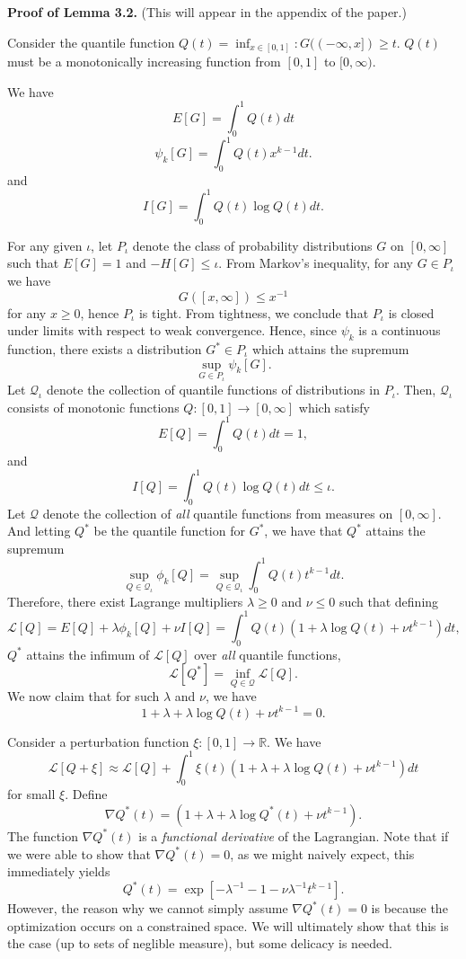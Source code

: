\documentclass[12pt]{article}
\begin{document}
\textbf{Proof of Lemma 3.2.} (This will appear in the appendix of the paper.)

Consider the quantile function $Q(t) = \inf_{x \in [0,1]}: G((-\infty, x]) \geq t.$
$Q(t)$ must be a monotonically increasing function from $[0,1]$ to $[0,\infty).$

We have
\[
E[G] = \int_0^1 Q(t) dt
\]
\[
\psi_k[G] = \int_0^1 Q(t) x^{k-1} dt.
\]
and
\[
I[G] = \int_0^1 Q(t) \log Q(t) dt.
\]

For any given $\iota$, let $P_\iota$ denote the class of probability
distributions $G$ on $[0, \infty]$ such that $E[G]=1$ and
$-H[G] \leq \iota.$  From Markov's inequality, for any $G \in P_\iota$
we have
\[
G([x, \infty]) \leq x^{-1}
\]
for any $x \geq 0$, hence $P_\iota$ is tight.  From tightness, we
conclude that $P_\iota$ is closed under limits with respect to weak
convergence.  Hence, since $\psi_k$ is a continuous function, there
exists a distribution $G^* \in P_\iota$ which attains the supremum
\[\sup_{G \in P_\iota} \psi_k[G].\]
Let $\mathcal{Q}_\iota$ denote the collection of quantile functions of
distributions in $P_\iota.$ Then, $\mathcal{Q}_\iota$ consists of monotonic functions
$Q: [0,1] \to [0, \infty]$ which
satisfy
\[
E[Q] = \int_0^1 Q(t) dt = 1,
\]
and
\[
I[Q] = \int_0^1 Q(t) \log Q(t) dt \leq \iota.
\]
Let $\mathcal{Q}$ denote the collection of \emph{all} quantile functions from measures on $[0,\infty]$.
And letting $Q^*$ be the quantile function for $G^*$, we have that
$Q^*$ attains the supremum
\[
\sup_{Q \in \mathcal{Q}_\iota} \phi_k[Q] = \sup_{Q \in \mathcal{Q}_\iota} \int_0^1 Q(t) t^{k-1} dt.
\]
Therefore, there exist Lagrange multipliers
$\lambda \geq 0$ and $\nu \leq 0$ such that defining
\[
\mathcal{L}[Q] = E[Q] + \lambda \phi_k[Q] + \nu I[Q] = \int_0^1 Q(t) (1 + \lambda \log Q(t) + \nu t^{k-1}) dt,
\]
$Q^*$ attains the infimum of $\mathcal{L}[Q]$ over \emph{all} quantile functions,
\[
\mathcal{L}[Q^*] = \inf_{Q \in \mathcal{Q}}\mathcal{L}[Q].
\]
We now claim that for such $\lambda$ and $\nu$, we have
\[
1 + \lambda + \lambda \log Q(t) + \nu t^{k-1} = 0.
\]

Consider a perturbation function $\xi: [0,1] \to \mathbb{R}$.
We have
\[
\mathcal{L}[Q + \xi] \approx \mathcal{L}[Q] + \int_0^1 \xi(t) (1 + \lambda + \lambda \log Q(t) + \nu t^{k-1}) dt
\]
for small $\xi$.
Define
\[
\nabla Q^*(t) = (1 + \lambda + \lambda \log Q^*(t) + \nu t^{k-1}).
\]
The function $\nabla Q^*(t)$ is a \emph{functional derivative} of the Lagrangian.
Note that if we were able to show that $\nabla Q^*(t) = 0$, as we might naively expect,
this immediately yields
\begin{equation}\label{eq:Qstareq}
Q^*(t) = \exp[-\lambda^{-1} - 1 - \nu\lambda^{-1} t^{k-1}].
\end{equation}
However, the reason why we cannot simply assume $\nabla Q^*(t) = 0$ is
because the optimization occurs on a constrained space.  We will
ultimately show that this is the case (up to sets of neglible
measure), but some delicacy is needed.
\end{document}
